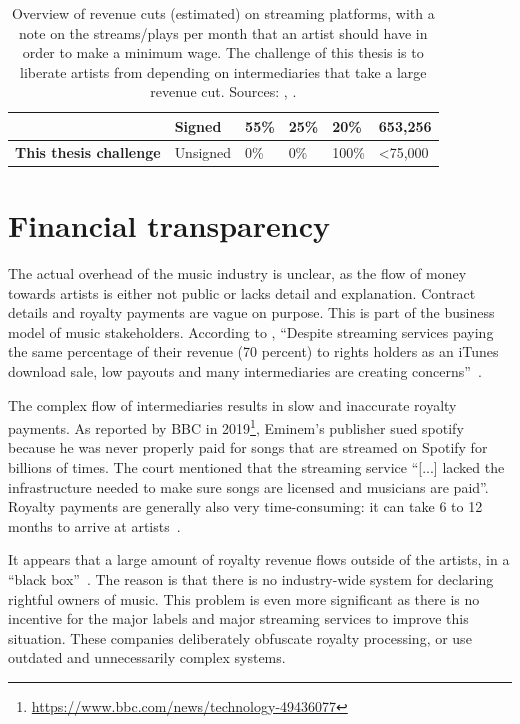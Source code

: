 \begin{table}[]
\begin{tabular}{|l|l|l|l|l|l|}
                               & Signed                      & 55\%               & 25\%                  & 20\%                     & 653,256                                                                                                    \\ \hline
\textbf{This thesis challenge} & Unsigned                    & 0\%                & 0\%                   & 100\%                    & \textless 75,000                                                                                           \\ \hline
\end{tabular}
\caption{Overview of revenue cuts (estimated) on streaming platforms, with a note on the streams/plays per month that an artist should have in order to make a minimum wage. The challenge of this thesis is to liberate artists from depending on intermediaries that take a large revenue cut. Sources: \cite{thetrichordist2014}, \cite{digitalmusicnews2018}.}
\label{tab:revenue-cuts}
\end{table}

\section{Financial transparency}
\label{sec:problem-financial-transparency}
The actual overhead of the music industry is unclear, as the flow of money towards artists is either not public or lacks detail and explanation. Contract details and royalty payments are vague on purpose. This is part of the business model of music stakeholders. According to \cite{music2015fair}, ``Despite streaming services paying the same percentage of their revenue (70 percent) to rights holders as an iTunes download sale, low payouts and many intermediaries are creating concerns''~\citep{music2015fair}.

The complex flow of intermediaries results in slow and inaccurate royalty payments. As reported by BBC in 2019\footnote{\url{https://www.bbc.com/news/technology-49436077}}, Eminem's publisher sued spotify because he was never properly paid for songs that are streamed on Spotify for billions of times. The court mentioned that the streaming service ``[...] lacked the infrastructure needed to make sure songs are licensed and musicians are paid''. Royalty payments are generally also very time-consuming: it can take 6 to 12 months to arrive at artists~\citep{music2015fair}. 

It appears that a large amount of royalty revenue flows outside of the artists, in a ``black box''~\citep{music2015fair}. The reason is that there is no industry-wide system for declaring rightful owners of music. This problem is even more significant as there is no incentive for the major labels and major streaming services to improve this situation. These companies deliberately obfuscate royalty processing, or use outdated and unnecessarily complex systems.

